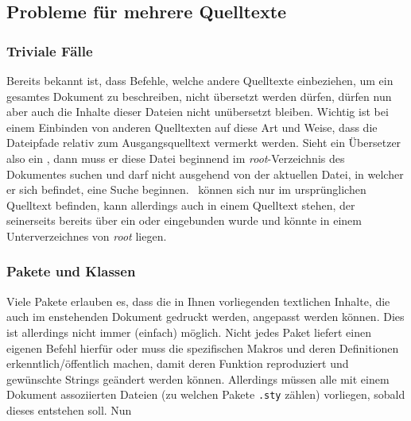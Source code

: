 \subsection{Probleme für mehrere Quelltexte}
\subsubsection{Triviale Fälle}%
Bereits bekannt ist, dass Befehle, welche andere Quelltexte einbeziehen, um ein gesamtes Dokument zu beschreiben, nicht übersetzt werden dürfen, dürfen nun aber auch die Inhalte dieser Dateien nicht unübersetzt bleiben.
Wichtig ist bei einem Einbinden von anderen Quelltexten auf diese Art und Weise, dass die Dateipfade relativ zum Ausgangsquelltext vermerkt werden. 
Sieht ein Übersetzer also ein \verb||, dann muss er diese Datei beginnend im \textit{root}-Verzeichnis des Dokumentes suchen und darf nicht ausgehend von der aktuellen Datei, in welcher er sich befindet, eine Suche beginnen.~\verb|| können sich nur im ursprünglichen Quelltext befinden, \verb|| kann allerdings auch in einem Quelltext stehen, der seinerseits bereits über ein \verb|| oder \verb|| eingebunden wurde und könnte in einem Unterverzeichnes von \textit{root} liegen.

\subsubsection{Pakete und Klassen}%
Viele Pakete erlauben es, dass die in Ihnen vorliegenden textlichen Inhalte, die auch im enstehenden Dokument gedruckt werden, angepasst werden können. Dies ist allerdings nicht immer (einfach) möglich. Nicht jedes Paket liefert einen eigenen Befehl hierfür oder muss die spezifischen Makros und deren Definitionen erkenntlich/öffentlich machen, damit deren Funktion reproduziert und gewünschte Strings geändert werden können. Allerdings müssen alle mit einem Dokument assoziierten Dateien (zu welchen Pakete \texttt{.sty} zählen) vorliegen, sobald dieses entstehen soll.
Nun 

